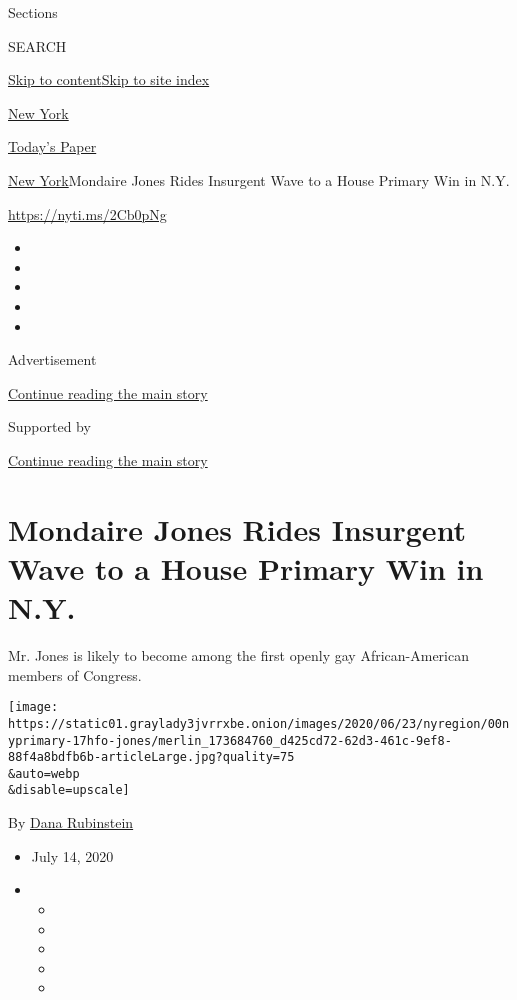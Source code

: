 Sections

SEARCH

\protect\hyperlink{site-content}{Skip to
content}\protect\hyperlink{site-index}{Skip to site index}

\href{https://www.nytimes3xbfgragh.onion/section/nyregion}{New York}

\href{https://myaccount.nytimes3xbfgragh.onion/auth/login?response_type=cookie\&client_id=vi}{}

\href{https://www.nytimes3xbfgragh.onion/section/todayspaper}{Today's
Paper}

\href{/section/nyregion}{New York}\textbar{}Mondaire Jones Rides
Insurgent Wave to a House Primary Win in N.Y.

\url{https://nyti.ms/2Cb0pNg}

\begin{itemize}
\item
\item
\item
\item
\item
\end{itemize}

Advertisement

\protect\hyperlink{after-top}{Continue reading the main story}

Supported by

\protect\hyperlink{after-sponsor}{Continue reading the main story}

\hypertarget{mondaire-jones-rides-insurgent-wave-to-a-house-primary-win-in-ny}{%
\section{Mondaire Jones Rides Insurgent Wave to a House Primary Win in
N.Y.}\label{mondaire-jones-rides-insurgent-wave-to-a-house-primary-win-in-ny}}

Mr. Jones is likely to become among the first openly gay
African-American members of Congress.

\texttt{[image: https://static01.graylady3jvrrxbe.onion/images/2020/06/23/nyregion/00nyprimary-17hfo-jones/merlin\_173684760\_d425cd72-62d3-461c-9ef8-88f4a8bdfb6b-articleLarge.jpg?quality=75\\\&auto=webp\\\&disable=upscale]}

By \href{https://www.nytimes3xbfgragh.onion/by/dana-rubinstein}{Dana
Rubinstein}

\begin{itemize}
\item
  July 14, 2020
\item
  \begin{itemize}
  \item
  \item
  \item
  \item
  \item
  \end{itemize}
\end{itemize}

